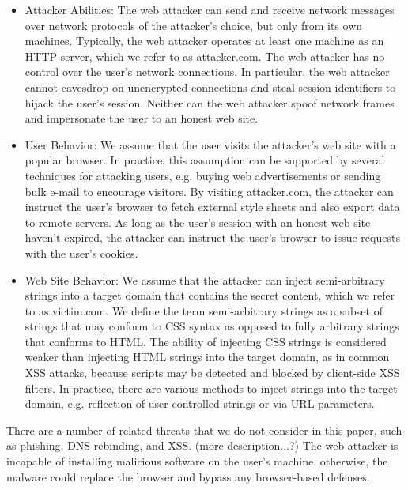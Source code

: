 \documentclass{acm_proc_article-sp}
\begin{document}
\begin{itemize}

\item{Attacker Abilities:}
The web attacker can send and receive network messages over network protocols of the attacker's choice, but only from its own machines. Typically, the web attacker operates at least one machine as an HTTP server, which we refer to as attacker.com. The web attacker has no control over the user's network connections. In particular, the web attacker cannot eavesdrop on unencrypted connections and steal session identifiers to hijack the user's session. Neither can the web attacker spoof network frames and impersonate the user to an honest web site.

\item{User Behavior:}
We assume that the user visits the attacker's web site with a popular browser. In practice, this assumption can be supported by several techniques for attacking users, e.g. buying web advertisements or sending bulk e-mail to encourage visitors. By visiting attacker.com, the attacker can instruct the user's browser to fetch external style sheets and also export data to remote servers. As long as the user's session with an honest web site haven't expired, the attacker can instruct the user's browser to issue requests with the user's cookies.

\item{Web Site Behavior:}
We assume that the attacker can inject semi-arbitrary strings into a target domain that contains the secret content, which we refer to as victim.com. We define the term semi-arbitrary strings as a subset of strings that may conform to CSS syntax as opposed to fully arbitrary strings that conforms to HTML. The ability of injecting CSS strings is considered weaker than injecting HTML strings into the target domain, as in common XSS attacks, because scripts may be detected and blocked by client-side XSS filters. In practice, there are various methods to inject strings into the target domain, e.g. reflection of user controlled strings or via URL parameters.

\end{itemize}

There are a number of related threats that we do not consider in this paper, such as phishing, DNS rebinding, and XSS.
(more description...?)
The web attacker is incapable of installing malicious software on the user's machine, otherwise, the malware could replace the browser and bypass any browser-based defenses.
\end{document}
